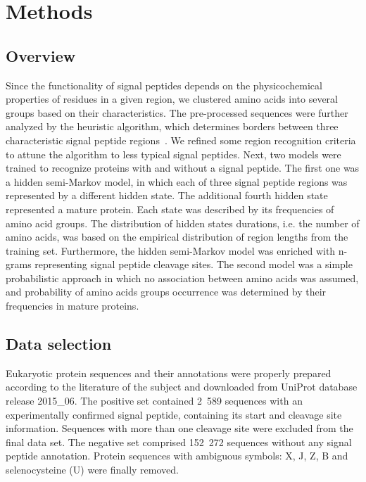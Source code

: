 \documentclass[fleqn,10pt,twoside]{gcb15submission}
\begin{document}
\section*{Methods}

\subsection*{Overview}

Since the functionality of signal peptides depends on the physicochemical properties of residues in a given region, we clustered amino acids into several groups based on their characteristics. The pre-processed sequences were further analyzed by the heuristic algorithm, which determines borders between three characteristic signal peptide regions~\citep{1998nielsenprediction}. We refined some region recognition criteria to attune the algorithm to less typical signal peptides. Next, two models were trained to recognize proteins with and without a signal peptide. The first one was a hidden semi-Markov model, in which each of three signal peptide regions was represented by a different hidden state. The additional fourth hidden state represented a mature protein. Each state was described by its frequencies of amino acid groups. The distribution of hidden states durations, i.e. the number of amino acids, was based on the empirical distribution of region lengths from the training set. Furthermore, the hidden semi-Markov model was enriched with n-grams representing signal peptide cleavage sites. The second model was a simple probabilistic approach in which no association between amino acids was assumed, and probability of amino acids groups occurrence was determined by their frequencies in mature proteins.

\subsection*{Data selection}

Eukaryotic protein sequences and their annotations were properly prepared according to the literature of the subject and downloaded from UniProt database release 2015\_06. The positive set contained 2~589 sequences with an experimentally confirmed signal peptide, containing its start and cleavage site information. Sequences with more than one cleavage site were excluded from the final data set. The negative set comprised 152~272 sequences without any signal peptide annotation. Protein sequences with ambiguous symbols: X, J, Z, B and selenocysteine (U) were finally removed.
\end{document}
